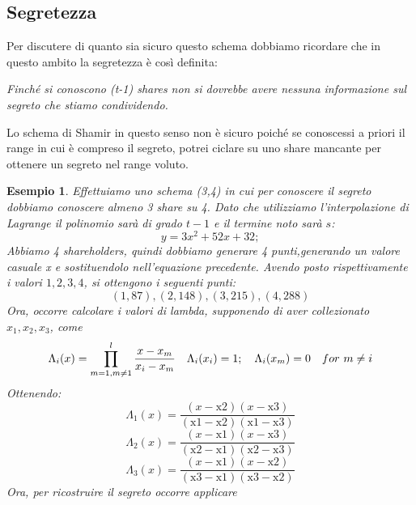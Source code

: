 \documentclass{book}
\newtheorem{esempio}{\textcolor{Grey1}{Esempio}}
\begin{document}
\subsection{Segretezza}
Per discutere di quanto sia sicuro questo schema dobbiamo ricordare che in questo ambito la segretezza è così definita:
\begin{center}
	\emph{Finché si conoscono (t-1) shares non si dovrebbe avere nessuna informazione sul segreto che stiamo condividendo.}
\end{center}
Lo schema di Shamir in questo senso non è sicuro poiché se conoscessi a priori il range in cui è compreso il segreto, potrei ciclare su uno share mancante per ottenere un segreto nel range voluto\@.
\begin{esempio}
	Effettuiamo uno schema (3,4) in cui per conoscere il segreto dobbiamo conoscere almeno 3 share su 4\@. Dato che utilizziamo l'interpolazione di Lagrange il polinomio sarà di grado \(t-1\) e il termine noto sarà \(s\):
	\begin{equation*}
		y=3 x^2+52 x+32;
	\end{equation*}
	Abbiamo 4 shareholders, quindi dobbiamo generare 4 punti,generando un valore casuale x e sostituendolo nell'equazione precedente. Avendo posto rispettivamente i valori \(1,2,3,4\), si ottengono i seguenti punti:
	\begin{equation*}
		(1,87),(2,148),(3,215),(4,288)
	\end{equation*}
	Ora, occorre calcolare i valori di lambda, supponendo di aver collezionato \(x_{1},x_{2},x_{3}\), come
	\begin{equation*}
		\centering
		\Lambda_{i}(x)=\prod_{m=1,m\neq1}^{l}{\frac{x-x_{m}}{x_{i}-x_{m}}}\quad \Lambda_{i}(x_{i})=1;\quad \Lambda_{i}(x_{m})=0\quad for\ m\neq i
	\end{equation*}
	Ottenendo:
	\begin{equation*}
		\Lambda_{1}(x)=\frac{(x-\text{x2}) (x-\text{x3}) }{(\text{x1}-\text{x2}) (\text{x1}-\text{x3}) }
	\end{equation*}
	\begin{equation*}
		\Lambda_{2}(x)=\frac{(x-\text{x1}) (x-\text{x3}) }{(\text{x2}-\text{x1}) (\text{x2}-\text{x3}) }
	\end{equation*}
	\begin{equation*}
		\Lambda_{3}(x)= \frac{(x-\text{x1}) (x-\text{x2}) }{(\text{x3}-\text{x1}) (\text{x3}-\text{x2}) }
	\end{equation*}
	Ora, per ricostruire il segreto occorre applicare
	\begin{equation*}

\end{equation*}
\end{esempio}
\end{document}

